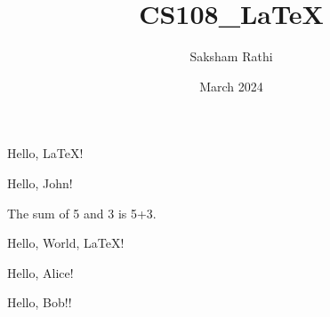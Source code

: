 \documentclass{article}
\title{CS108\_LaTeX}
\author{Saksham Rathi}
\date{March 2024}
\newcommand{\myHello}{Hello, LaTeX!}
\newcommand{\myGreet}[1]{Hello, #1!}
\newcommand{\mySum}[2]{The sum of #1 and #2 is #1+#2.}
\newcommand{\myDefault}[2][World]{Hello, #1, #2!}
\newcommand{\myOpt}[2][]{Hello, #2#1!}
\begin{document}
\maketitle

\myHello

\myGreet{John}

\mySum{5}{3}

\myDefault{LaTeX}

\myOpt{Alice}

\myOpt[!]{Bob}
\end{document}

